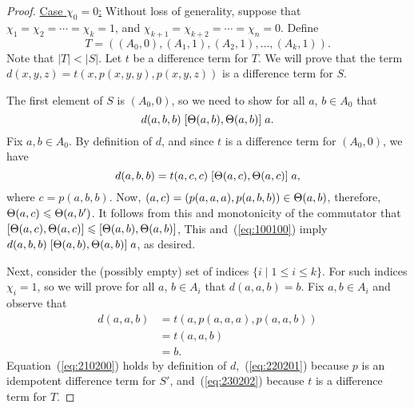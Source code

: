 \begin{proof}
\vskip3mm

\noindent \underline{Case $\chi_0 = 0$:}
Without loss of generality, suppose that
$\chi_1 = \chi_2 = \cdots =\chi_k = 1$,
and
$\chi_{k+1} = \chi_{k+2} = \cdots = \chi_{n} = 0$.
Define
\[
T = ((A_0, 0), (A_1, 1), (A_2, 1), \dots, (A_k, 1)).
\]
Note that $|T| < |S|$.
Let $t$ be a \glocal difference term for $T$.
We will prove that the term $d(x,y,z) = t(x, p(x,y,y), p(x,y,z))$
is a \glocal difference term for $S$.

The first element of $S$ is $(A_0, 0)$, so we need to show for all $a$, $b \in A_0$
that
\[
d(a,b,b) \mathrel{[\Theta(a,b), \Theta(a,b)]} a.
\]
Fix $a, b \in A_0$.
By definition of $d$, and since
$t$ is a \glocal difference term for $(A_0, 0)$, we have
\begin{equation}
  \label{eq:100100}
  d(a,b,b) 
  =t(a, c, c)\comm{\Cg(a, c)}{\Cg(a, c)} a,
\end{equation}
where $c = p(a,b,b)$.
Now, $(a, c) = (p(a,a,a), p(a,b,b)) \in \Theta(a, b)$, therefore,
$\Theta(a, c) \leqslant \Theta(a,b')$.
It follows from this and monotonicity of the commutator that
$\mathrel{[\Theta(a, c), \Theta(a, c)]} {\leqslant} \mathrel{[\Theta(a,b), \Theta(a,b)]}$,
This and~(\ref{eq:100100}) imply
$d(a,b,b)\mathrel{[\Theta(a,b), \Theta(a,b)]} a$,
as desired.

Next, consider the (possibly empty) set of indices $\{i \mid 1\leq i \leq k\}$.
For such indices $\chi_i =1$, so we will prove
for all $a$, $b \in A_i$ that $d(a,a,b) = b$.
Fix $a, b \in A_i$ and observe that
\begin{align}
  d(a,a,b) &=
  t(a, p(a,a,a), p(a,a,b)) \label{eq:210200}\\
  &=t(a,a,b) \label{eq:220201}\\
  &=b. \label{eq:230202}
\end{align}
Equation~(\ref{eq:210200}) holds by definition of $d$,~(\ref{eq:220201})
because $p$ is an idempotent \glocal difference term for
$S'$, and~(\ref{eq:230202}) because $t$ is a \glocal difference term for $T$.


\end{proof}
